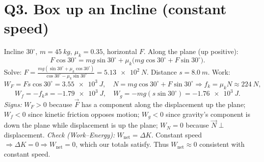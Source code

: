 \documentclass[11pt]{article}
\newcommand{\ans}[1]{\boxed{\displaystyle #1}}
\begin{document}
\section*{Q3. Box up an Incline (constant speed)}
Incline $30^{\circ}$, $m=\SI{45}{kg}$, $\mu_k=0.35$, horizontal $F$. Along the plane (up positive):
\[ F\cos30^{\circ} = mg\sin30^{\circ}+\mu_k\bigl(mg\cos30^{\circ}+F\sin30^{\circ}\bigr). \]
Solve: $\displaystyle F=\frac{mg(\sin30^{\circ}+\mu_k\cos30^{\circ})}{\cos30^{\circ}-\mu_k\sin30^{\circ}}=\ans{\SI{5.13e2}{N}}.$
Distance $s=\SI{8.0}{m}$. Work:
\[ W_F = Fs\cos30^{\circ}=\ans{\SI{3.55e3}{J}},\quad N=mg\cos30^{\circ}+F\sin30^{\circ}\Rightarrow f_k=\mu_k N\approx\SI{224}{N},\]
\[ W_{\!f}=-f_k s=\ans{\SI{-1.79e3}{J}},\quad W_g=-mg(s\sin30^{\circ})=\ans{\SI{-1.76e3}{J}}. \]
\textit{Signs:} $W_F>0$ because $\vec F$ has a component along the displacement up the plane; $W_{\!f}<0$ since kinetic friction opposes motion; $W_g<0$ since gravity’s component is down the plane while displacement is up the plane; $W_N=0$ because $\vec N\perp$ displacement.
\textit{Check (Work--Energy):} $W_{\text{net}}=\Delta K$. Constant speed $\Rightarrow \Delta K=0\Rightarrow W_{\text{net}}=0$, which our totals satisfy.
Thus $W_{\text{net}}\approx0$ consistent with constant speed.
\end{document}
